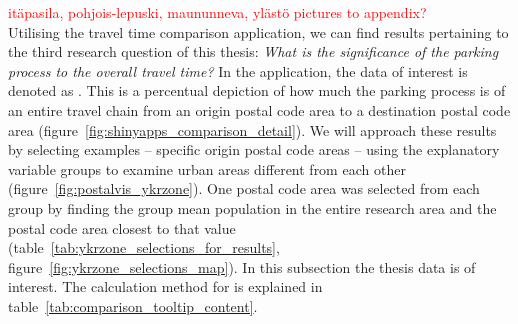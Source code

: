 \textcolor{red}{itäpasila, pohjois-lepuski, maununneva, ylästö pictures to appendix?}\\
Utilising the travel time comparison application, we can find results pertaining to the third research question of this thesis: \textit{What is the significance of the parking process to the overall travel time?} In the application, the data of interest is denoted as . This is a percentual depiction of how much the parking process is of an entire travel chain from an origin postal code area to a destination postal code area (figure~\ref{fig:shinyapps_comparison_detail}). We will approach these results by selecting examples -- specific origin postal code areas -- using the explanatory variable  groups to examine urban areas different from each other (figure~\ref{fig:postalvis_ykrzone}). One postal code area was selected from each  group by finding the group mean population in the entire research area and the postal code area closest to that value (table~\ref{tab:ykrzone_selections_for_results}, figure~\ref{fig:ykrzone_selections_map}). In this subsection the thesis data  is of interest. The calculation method for  is explained in table~\ref{tab:comparison_tooltip_content}.


